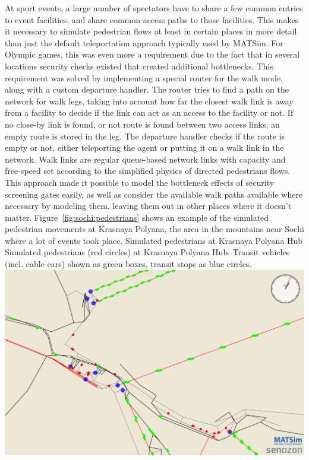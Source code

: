 At sport events, a large number of spectators have to share a few common entries
to event facilities, and share common access paths to those facilities. This
makes it necessary to simulate pedestrian flows at least in certain places in
more detail than just the default teleportation approach typically used by
MATSim. For Olympic games, this was even more a requirement due to the fact
that in several locations security checks existed that created additional
bottlenecks. This requirement was solved by implementing a special router for
the walk mode, along with a custom departure handler. The router tries to find a
path on the network for walk legs, taking into account how far the closest walk
link is away from a facility to decide if the link can act as an access to the
facility or not. If no close-by link is found, or not route is found between
two access links, an empty route is stored in the leg. The departure handler
checks if the route is empty or not, either teleporting the agent or putting it
on a walk link in the network. Walk links are regular queue-based network links
with capacity and free-speed set according to the simplified physics of
directed pedestrians flows. This approach made it possible to model the
bottleneck effects of security screening gates easily, as well as consider the
available walk paths available where necessary by modeling them, leaving them
out in other places where it doesn't matter. Figure~\ref{fig:sochi:pedestrians}
shows an example of the simulated pedestrian movements at Krasnaya Polyana, the
area in the mountains near Sochi where a lot of events took place.  
%
\createfigure%
{Simulated pedestrians at Krasnaya Polyana Hub}%
{Simulated pedestrians (red circles) at Krasnaya Polyana Hub. Transit vehicles
(incl. cable cars) shown as green boxes, transit stops as blue circles.}%
{\label{fig:sochi:pedestrians}}%
{\includegraphics[width=1.\textwidth,angle=0]{./using/figures/sochi_pedestrians.pdf}}%
{}
%


